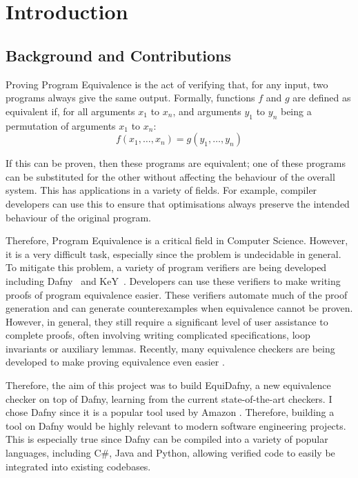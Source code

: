 \chapter{Introduction}\label{chp:introduction}

\section{Background and Contributions}\label{sec:intro-background}

Proving Program Equivalence is the act of verifying that, for any input, two programs always give the same output. Formally, functions \(f\) and \(g\) are defined as equivalent if, for all arguments \(x_1\) to \(x_n\), and arguments \(y_1\) to \(y_n\) being a permutation of arguments \(x_1\) to \(x_n\): \[ f(x_1, \ldots, x_n) = g(y_1, \ldots, y_n) \]

If this can be proven, then these programs are equivalent; one of these programs can be substituted for the other without affecting the behaviour of the overall system. This has applications in a variety of fields. For example, compiler developers can use this to ensure that optimisations always preserve the intended behaviour of the original program.

Therefore, Program Equivalence is a critical field in Computer Science. However, it is a very difficult task, especially since the problem is undecidable in general. To mitigate this problem, a variety of program verifiers are being developed including Dafny~\cite{leinoDafnyAutomaticProgram2010} and KeY~\cite{ahrendtUsingKeYProver2016}. Developers can use these verifiers to make writing proofs of program equivalence easier. These verifiers automate much of the proof generation and can generate counterexamples when equivalence cannot be proven. However, in general, they still require a significant level of user assistance to complete proofs, often involving writing complicated specifications, loop invariants or auxiliary lemmas. Recently, many equivalence checkers are being developed to make proving equivalence even easier \parencite{lahiriSYMDIFFLanguageAgnosticSemantic2012,milovancevicProvingDisprovingEquivalence2023,felsingAutomatingRegressionVerification2014,godlinRegressionVerificationProving2013}.

Therefore, the aim of this project was to build EquiDafny, a new equivalence checker on top of Dafny, learning from the current state-of-the-art checkers. I chose Dafny since it is a popular tool used by Amazon \parencite{leinoDafnyAutomaticProgram2010}. Therefore, building a tool on Dafny would be highly relevant to modern software engineering projects. This is especially true since Dafny can be compiled into a variety of popular languages, including C\#, Java and Python, allowing verified code to easily be integrated into existing codebases. 

